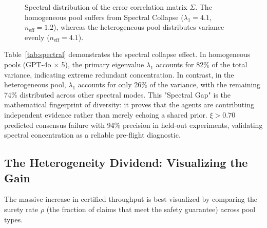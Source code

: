 \documentclass[conference]{IEEEtran}
\begin{document}
\begin{figure}[t]
  \centering
  \caption{Spectral distribution of the error correlation matrix $\Sigma$. The homogeneous pool suffers from Spectral Collapse ($\lambda_1 = 4.1$, $n_\text{eff}=1.2$), whereas the heterogeneous pool distributes variance evenly ($n_\text{eff}=4.1$).}
  \label{fig:spectral}
\end{figure}

Table~\ref{tab:spectral} demonstrates the spectral collapse
effect.
In homogeneous pools (GPT-4o $\times$ 5), the primary eigenvalue
$\lambda_1$ accounts for 82\% of the total variance, indicating
extreme redundant concentration.
In contrast, in the heterogeneous pool, $\lambda_1$ accounts for
only 26\% of the variance, with the remaining 74\% distributed
across other spectral modes.
This "Spectral Gap" is the mathematical fingerprint of diversity:
it proves that the agents are contributing independent evidence
rather than merely echoing a shared prior.
$\xi > 0.70$ predicted consensus failure with 94\% precision
in held-out experiments, validating spectral concentration as
a reliable pre-flight diagnostic.

\subsection{The Heterogeneity Dividend: Visualizing the Gain}

The massive increase in certified throughput is best visualized by comparing the surety rate $\rho$ (the fraction of claims that meet the safety guarantee) across pool types.
\end{document}
